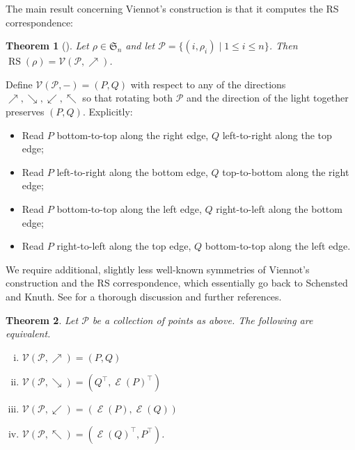 \documentclass{amsart}
\newtheorem{theorem}{Theorem}[section]
\theoremstyle{definition}
\DeclareMathOperator{\RS}{RS}
\DeclareMathOperator{\evacuation}{\mathcal{E}}
\begin{document}
The main result concerning Viennot's construction is that it computes the RS correspondence:

\begin{theorem}[{\cite{Viennot-geometric}}]\label{thm:Viennot-basic}
    Let $\rho \in \mathfrak{S}_n$ and let $\mathcal{P} = \{(i, \rho_i) \mid 1 \leq i \leq n\}$. Then $\RS(\rho) = \mathcal{V}(\mathcal{P}, \nearrow)$.
\end{theorem}

Define $\mathcal{V}(\mathcal{P}, -) = (P, Q)$ with respect to any of the directions $\nearrow, \searrow, \swarrow, \nwarrow$ so that rotating both $\mathcal{P}$ and the direction of the light together preserves $(P, Q)$. Explicitly:
\begin{itemize}
    \item[($\nearrow$)] Read $P$ bottom-to-top along the right edge, $Q$ left-to-right along the top edge;
    \item[($\searrow$)] Read $P$ left-to-right along the bottom edge, $Q$ top-to-bottom along the right edge;
    \item[($\swarrow$)] Read $P$ bottom-to-top along the left edge, $Q$ right-to-left along the bottom edge;
    \item[($\nwarrow$)] Read $P$ right-to-left along the top edge, $Q$ bottom-to-top along the left edge.  
\end{itemize}

We require additional, slightly less well-known symmetries of Viennot's construction and the RS correspondence, which essentially go back to Schensted and Knuth. See \cite[\S4.1]{vanLeeuwen} for a thorough discussion and further references.

\begin{theorem}\label{thm:Viennot-symmetries}
    Let $\mathcal{P}$ be a collection of points as above. The following are equivalent.
    \begin{enumerate}[(i)]
        \item $\mathcal{V}(\mathcal{P}, \nearrow) = (P, Q)$
        \item $\mathcal{V}(\mathcal{P}, \searrow) = (Q^\top, \evacuation(P)^\top)$
        \item $\mathcal{V}(\mathcal{P}, \swarrow) = (\evacuation(P), \evacuation(Q))$
        \item $\mathcal{V}(\mathcal{P}, \nwarrow) = (\evacuation(Q)^\top, P^\top)$.
    \end{enumerate}
\end{theorem}
\end{document}
